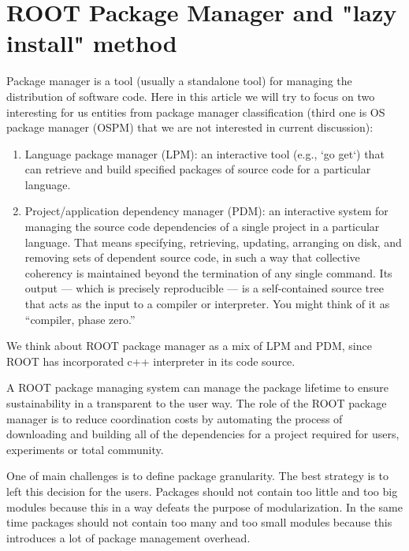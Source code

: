 \documentclass{webofc}
\begin{document}


\section{ROOT Package Manager and "lazy install" method}

Package manager is a tool (usually a standalone tool) for managing the distribution of software code. 
Here in this article we will try to focus on two interesting for us entities from package manager classification (third one is OS package manager (OSPM) that we are not interested in current discussion):
\begin{enumerate}
\item Language package manager (LPM): an interactive tool (e.g., `go get`) that can retrieve and build specified packages of source code for a particular language.
\item Project/application dependency manager (PDM): an interactive system for managing the source code dependencies of a single project in a particular language. That means specifying, retrieving, updating, arranging on disk, and removing sets of dependent source code, in such a way that collective coherency is maintained beyond the termination of any single command. Its output — which is precisely reproducible — is a self-contained source tree that acts as the input to a compiler or interpreter. You might think of it as “compiler, phase zero.”
\end{enumerate}
We think about ROOT package manager as a mix of LPM and PDM, since ROOT has incorporated c++ interpreter in its code source.

A ROOT package managing system can manage the package lifetime to ensure sustainability in a transparent to the user way. The role of the ROOT package manager is to reduce coordination costs by automating the process of downloading and building all of the dependencies for a project required for users, experiments or total community.

One of main challenges is to define package granularity. The best strategy is to left this decision for the users. Packages should not contain too little and too big modules because this in a way defeats the purpose of modularization. In the same time packages should not contain too many and too small modules because this introduces a lot of package management overhead.
\end{document}
